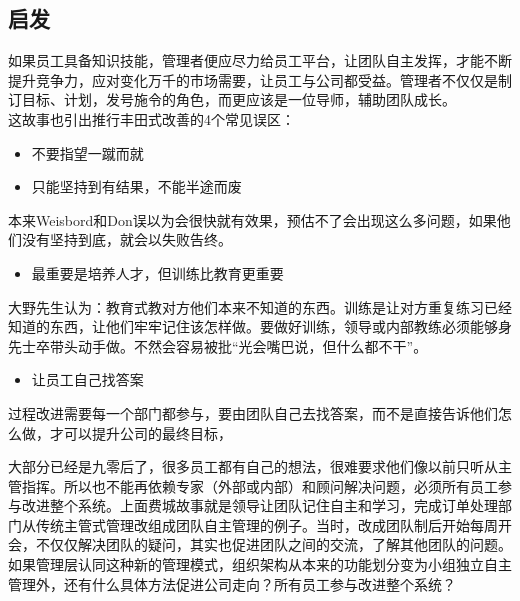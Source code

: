 \hypertarget{ux542fux53d1}{%
\subsection{启发}\label{ux542fux53d1}}

如果员工具备知识技能，管理者便应尽力给员工平台，让团队自主发挥，才能不断提升竞争力，应对变化万千的市场需要，让员工与公司都受益。管理者不仅仅是制订目标、计划，发号施令的角色，而更应该是一位导师，辅助团队成长。\\
这故事也引出推行丰田式改善的4个常见误区：

\begin{itemize}
\tightlist
\item
  不要指望一蹴而就
\item
  只能坚持到有结果，不能半途而废
\end{itemize}

\begin{description}
\tightlist
\item[]
本来Weisbord和Don误以为会很快就有效果，预估不了会出现这么多问题，如果他们没有坚持到底，就会以失败告终。
\end{description}

\begin{itemize}
\tightlist
\item
  最重要是培养人才，但训练比教育更重要
\end{itemize}

\begin{description}
\tightlist
\item[]
大野先生认为：教育式教对方他们本来不知道的东西。训练是让对方重复练习已经知道的东西，让他们牢牢记住该怎样做。要做好训练，领导或内部教练必须能够身先士卒带头动手做。不然会容易被批``光会嘴巴说，但什么都不干''。
\end{description}

\begin{itemize}
\tightlist
\item
  让员工自己找答案
\end{itemize}

过程改进需要每一个部门都参与，要由团队自己去找答案，而不是直接告诉他们怎么做，才可以提升公司的最终目标，

大部分已经是九零后了，很多员工都有自己的想法，很难要求他们像以前只听从主管指挥。所以也不能再依赖专家（外部或内部）和顾问解决问题，必须所有员工参与改进整个系统。上面费城故事就是领导让团队记住自主和学习，完成订单处理部门从传统主管式管理改组成团队自主管理的例子。当时，改成团队制后开始每周开会，不仅仅解决团队的疑问，其实也促进团队之间的交流，了解其他团队的问题。如果管理层认同这种新的管理模式，组织架构从本来的功能划分变为小组独立自主管理外，还有什么具体方法促进公司走向？所有员工参与改进整个系统？



